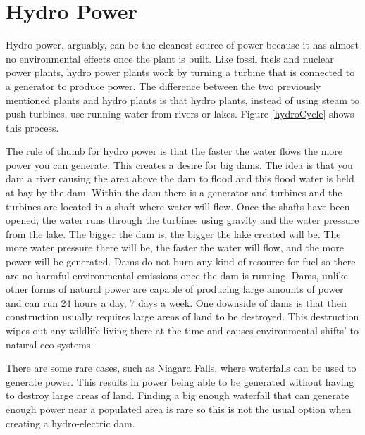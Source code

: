 \documentclass[msc,oneside]{ubcthesis}%
\begin{document}
\section{Hydro Power}

Hydro power, arguably, can be the cleanest source of power because it has almost no 
environmental effects once the plant is built. Like fossil fuels and nuclear power plants, hydro power 
plants work by turning a turbine that is connected to a generator to produce power. The difference between the two previously mentioned plants and hydro plants is that hydro plants, instead of using 
steam to push turbines, use running water from rivers or lakes. Figure \ref{hydroCycle} shows this process.

The rule of thumb for hydro power is that the faster the water flows the more power you can generate. This 
creates a desire for big dams. The idea is that you dam a river causing the area above the dam 
to flood and this flood water is held at bay by the dam. Within the dam there is a generator and turbines and the turbines are located in a shaft where water will flow. Once the shafts have been opened, the water runs through the turbines using gravity and the water pressure from the lake. The bigger the dam is, the bigger the lake created will be. The more water pressure there will be, the faster the water will flow, and the more power will be generated. 
 Dams do not burn any kind of resource for fuel so there are no harmful environmental emissions once the dam is running. Dams, unlike other forms of natural power are capable of producing large amounts of power and can run 24 hours a day, 7 days a week. One downside of dams is that their construction usually requires large areas of land to be destroyed. This destruction wipes out any wildlife living there at the time and causes environmental shifts' to natural eco-systems. 

There are some rare cases, such as Niagara Falls, where waterfalls can be used to generate power. This results in power being able to be generated without having to destroy large areas of land. Finding a big enough waterfall that can generate enough power near a populated area is rare so this is not the usual option when creating a hydro-electric dam. 
\end{document}
